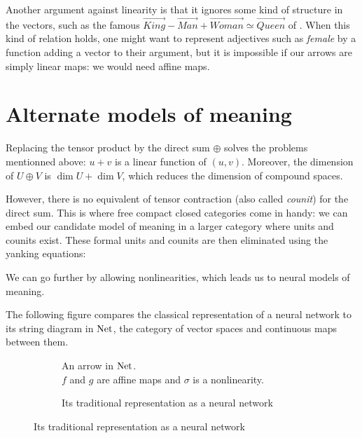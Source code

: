 \documentclass[a4paper,11pt]{article}
\begin{document}
Another argument against linearity is that it ignores some kind
of structure in the vectors, such as the famous $\vec{King} - \vec{Man}
+ \vec{Woman} \simeq \vec{Queen}$ of \cite{mikolov2013efficient}. When this
kind of relation holds, one might want to represent adjectives such as \emph{female}
by a function adding a vector to their argument, but it is
impossible if our arrows are simply linear maps: we would need affine maps.

\section{Alternate models of meaning}

Replacing the tensor product by the direct sum $\oplus$ solves
the problems mentionned above: $u + v$ is a linear function of $(u,v)$.
Moreover, the dimension of $U \oplus V$ is $\dim U + \dim V$,
which reduces the dimension of compound spaces.

However, there is no equivalent of tensor contraction (also called \emph{counit})
for the direct sum.
This is where free compact closed categories come in handy: we can embed
our candidate model of meaning in a larger category where units and counits exist.
These formal units and counits are then eliminated using the yanking equations:



We can go further by allowing
nonlinearities, which leads us to neural models of meaning. 

The following figure compares the
classical representation of a neural network to its string diagram in
$\operatorname{Net}$, the category of vector spaces and continuous maps between them.

\begin{figure}[H]
  \centering
  \begin{subfigure}[b]{0.45\textwidth}
    \caption{An arrow in $\operatorname{Net}$. \\ $f$ and $g$ are affine maps and $\sigma$ is a nonlinearity.}
    \label{fig:normalform}
  \end{subfigure}
  \begin{subfigure}[b]{0.45\textwidth}
    
    \caption{Its traditional representation as a neural network}
    \label{fig:neuralnet}
  \end{subfigure}
\end{figure}



\end{document}

